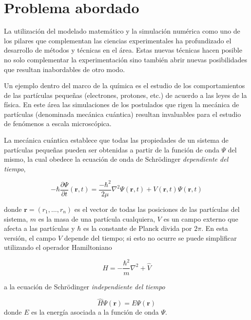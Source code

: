 \section{Problema abordado}

La utilizaci\'on del modelado matem\'atico y la simulaci\'on num\'erica como uno de los pilares que complementan las ciencias experimentales ha profundizado el desarrollo de m\'etodos y t\'ecnicas en el \'area.
Estas nuevas t\'ecnicas hacen posible no solo complementar la experimentaci\'on sino tambi\'en abrir nuevas posibilidades que resultan inabordables de otro modo.

Un ejemplo dentro del marco de la qu\'imica es el estudio de los comportamientos de las part\'iculas peque\~nas (electrones, protones, etc.) de acuerdo a las leyes de la f\'isica. 
En este \'area las simulaciones de los postulados que rigen la mec\'anica de part\'iculas (denominada mec\'anica cu\'antica) resultan invaluables para el estudio de fen\'omenos a escala microsc\'opica.

La mec\'anica cu\'antica establece que todas las propiedades de un sistema de part\'iculas peque\~nas
pueden ser obtenidas a partir de la funci\'on de onda $\Psi$ del mismo, la cual obedece la
ecuaci\'on de onda de Schr\"odinger \textit{dependiente del tiempo},

\begin{equation}
    \label{schro_time_dep}
    -\hbar\frac{\partial \Psi}{\partial t} (\mathbf{r},t) = \frac{-\hbar^2}{2\mu}\nabla^2 \Psi(\mathbf{r},t) + V(\mathbf{r},t) \Psi(\mathbf{r},t)
\end{equation}

donde $\mathbf{r} = (r_1,\dots,r_n)$ es el vector de todas las posiciones de las part\'iculas del sistema,
$m$ es la masa de una part\'icula cualquiera, $V$ es un campo externo que afecta a las part\'iculas y
$\hbar$ es la constante de Planck divida por $2\pi$. En esta versi\'on, el campo $V$ depende del tiempo; si
esto no ocurre se puede simplificar utilizando el operador Hamiltoniano

\begin{equation*}
    \hat{H} =  -\frac{\hbar^2}{m} \nabla^2 + \hat{V}
\end{equation*}

a la ecuaci\'on de Schr\"odinger \textit{independiente del tiempo}

\begin{equation}
    \label{schro_time_indep}
    \hat{H} \Psi(\mathbf{r}) = E \Psi(\mathbf{r})
\end{equation}
donde $E$ es la energ\'ia asociada a la funci\'on de onda $\Psi$.

